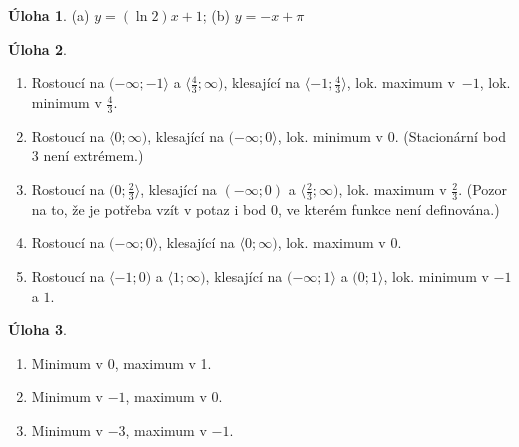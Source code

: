 \documentclass[12pt,a4paper]{article}
\theoremstyle{definition}
\newtheorem{uloha}{Úloha}
\begin{document}
\setcounter{uloha}{0}

\begin{uloha}
(a) $y = (\ln 2) x + 1$; (b) $y = -x + \pi$
\end{uloha}


\begin{uloha}
\begin{enumerate}
	\item Rostoucí na $(-\infty; -1\rangle$ a $\langle \frac43; \infty)$, klesající na $\langle -1; \frac43 \rangle$, lok. maximum v~$-1$, lok. minimum v $\frac43$.
	\item Rostoucí na $\langle0; \infty)$, klesající na $(-\infty; 0\rangle$, lok. minimum v $0$. (Stacionární bod $3$ není extrémem.)
	\item Rostoucí na $(0; \frac23\rangle$, klesající na $(-\infty; 0)$ a $\langle \frac23; \infty)$, lok. maximum v $\frac23$. (Pozor na to, že je potřeba vzít v potaz i bod $0$, ve kterém funkce není definována.)
	\item Rostoucí na $(-\infty; 0\rangle$, klesající na $\langle0; \infty)$, lok. maximum v $0$.
	\item Rostoucí na $\langle-1; 0)$ a $\langle1; \infty)$, klesající na $(-\infty; 1\rangle$ a $(0; 1\rangle$, lok. minimum v $-1$ a $1$.
\end{enumerate}
\end{uloha}


\begin{uloha}
\begin{enumerate}
	\item Minimum v 0, maximum v 1.
	\item Minimum v $-1$, maximum v $0$.
	\item Minimum v $-3$, maximum v $-1$.
\end{enumerate}
\end{uloha}
\end{document}
